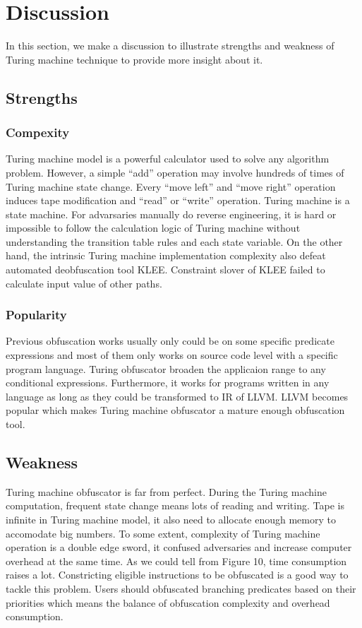 \documentclass[lnicst]{svmultln}
\begin{document}
\section{Discussion}
In this section, we make a discussion to illustrate strengths and weakness of Turing machine technique to provide more insight about it. 
\subsection{Strengths}
\subsubsection{Compexity}
Turing machine model is a  powerful calculator used to solve any algorithm problem. However, a simple ``add'' operation may involve hundreds of times of Turing machine state change. Every ``move left'' and ``move right'' operation induces tape modification and ``read'' or ``write'' operation. Turing machine is a state machine. For advarsaries manually do reverse engineering, it is hard or impossible to follow the calculation logic of Turing machine  without understanding the transition table rules and each state variable. On the other hand, the intrinsic Turing machine implementation complexity also defeat automated deobfuscation tool KLEE. Constraint slover of KLEE failed to calculate input value of other paths. 
\subsubsection{Popularity}
Previous obfuscation works\cite{Sharif} usually only could be on some specific predicate expressions and most of them only works on source code level with a specific program language\cite{Trans}. Turing obfuscator broaden the applicaion range to any conditional expressions. Furthermore, it works for programs written in any language as long as they could be transformed to IR of LLVM. LLVM becomes popular which makes Turing machine obfuscator a mature enough obfuscation tool.

\subsection{Weakness}
Turing machine obfuscator is far from perfect. During the Turing machine computation, frequent state change means lots of reading and writing. Tape is infinite in Turing machine model, it also need to allocate enough memory to accomodate big numbers. To some extent, complexity of Turing machine operation is a double edge sword, it confused adversaries and increase computer overhead at the same time. As we could tell from Figure 10, time consumption raises a lot. Constricting eligible instructions to be obfuscated is a good way to tackle this problem. Users should obfuscated branching predicates based on their priorities which means the balance of obfuscation complexity and overhead consumption.
\end{document}

